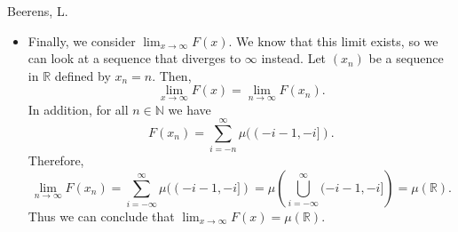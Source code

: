 \begin{solution}[3.11]{Beerens, L.}
\begin{itemize}
        \item Finally, we consider $\lim_{x\rightarrow \infty}F(x)$. We know that this limit exists, so we can look at a sequence that diverges to $\infty$ instead. Let $(x_n)$ be a sequence in $\mathbb{R}$ defined by $x_n = n$. Then,
        $$
            \lim_{x\rightarrow \infty}F(x) = \lim_{n\rightarrow \infty}F(x_n).
        $$
        In addition, for all $n\in\mathbb{N}$ we have
        $$
            F(x_n) = \sum_{i=-n}^{\infty}\mu((-i-1,-i]).
        $$
        Therefore,
        $$
            \lim_{n\rightarrow\infty}F(x_n) = \sum_{i=-\infty}^{\infty}\mu((-i-1,-i]) = \mu\left( \bigcup_{i=-\infty}^{\infty}(-i-1,-i] \right) = \mu(\mathbb{R}).
        $$
        Thus we can conclude that $\lim_{x\rightarrow \infty}F(x) = \mu(\mathbb{R})$.
    \end{itemize}
\end{solution}